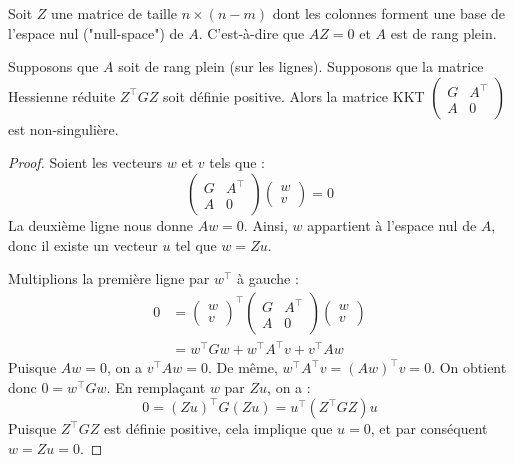 Soit $Z$ une matrice de taille $n \times (n-m)$ dont les colonnes forment une base de l'espace nul ("null-space") de $A$. C'est-à-dire que $AZ = 0$ et $A$ est de rang plein.

\begin{lemme}
    Supposons que $A$ soit de rang plein (sur les lignes). Supposons que la matrice Hessienne réduite $Z^\top G Z$ soit définie positive.
    Alors la matrice KKT $\begin{pmatrix} G & A^\top \\ A & 0 \end{pmatrix}$ est non-singulière.
\end{lemme}

\begin{proof}
    Soient les vecteurs $w$ et $v$ tels que :
    \begin{equation}
        \begin{pmatrix}
            G & A^\top \\
            A & 0
        \end{pmatrix}
        \begin{pmatrix}
            w \\
            v
        \end{pmatrix}
        = 0
    \end{equation}
    La deuxième ligne nous donne $Aw = 0$. Ainsi, $w$ appartient à l'espace nul de $A$, donc il existe un vecteur $u$ tel que $w = Zu$.
    
    Multiplions la première ligne par $w^\top$ à gauche :
    \begin{align*}
        0 &= \begin{pmatrix} w \\ v \end{pmatrix}^\top \begin{pmatrix} G & A^\top \\ A & 0 \end{pmatrix} \begin{pmatrix} w \\ v \end{pmatrix} \\
          &= w^\top G w + w^\top A^\top v + v^\top A w
    \end{align*}
    Puisque $Aw = 0$, on a $v^\top A w = 0$. De même, $w^\top A^\top v = (Aw)^\top v = 0$.
    On obtient donc $0 = w^\top G w$.
    En remplaçant $w$ par $Zu$, on a :
    \begin{equation}
        0 = (Zu)^\top G (Zu) = u^\top (Z^\top G Z) u
    \end{equation}
    Puisque $Z^\top G Z$ est définie positive, cela implique que $u = 0$, et par conséquent $w = Zu = 0$.
    

\end{proof}
